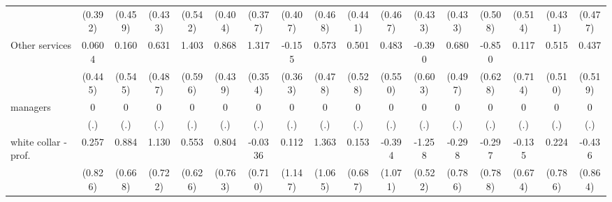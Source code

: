 {\begin{tabular}{l*{16}{c}}
                    &     (0.392)         &     (0.459)         &     (0.433)         &     (0.542)         &     (0.404)         &     (0.377)         &     (0.407)         &     (0.468)         &     (0.441)         &     (0.467)         &     (0.433)         &     (0.433)         &     (0.508)         &     (0.514)         &     (0.431)         &     (0.477)         \\
[1em]
Other services      &      0.0604         &       0.160         &       0.631         &       1.403\sym{*}  &       0.868\sym{*}  &       1.317\sym{***}&      -0.155         &       0.573         &       0.501         &       0.483         &      -0.390         &       0.680         &      -0.850         &       0.117         &       0.515         &       0.437         \\
                    &     (0.445)         &     (0.545)         &     (0.487)         &     (0.596)         &     (0.439)         &     (0.354)         &     (0.363)         &     (0.478)         &     (0.528)         &     (0.550)         &     (0.603)         &     (0.497)         &     (0.628)         &     (0.714)         &     (0.510)         &     (0.519)         \\
[1em]
managers            &           0         &           0         &           0         &           0         &           0         &           0         &           0         &           0         &           0         &           0         &           0         &           0         &           0         &           0         &           0         &           0         \\
                    &         (.)         &         (.)         &         (.)         &         (.)         &         (.)         &         (.)         &         (.)         &         (.)         &         (.)         &         (.)         &         (.)         &         (.)         &         (.)         &         (.)         &         (.)         &         (.)         \\
[1em]
white collar - prof.&       0.257         &       0.884         &       1.130         &       0.553         &       0.804         &     -0.0336         &       0.112         &       1.363         &       0.153         &      -0.394         &      -1.258\sym{*}  &      -0.298         &      -0.297         &      -0.135         &       0.224         &      -0.436         \\
                    &     (0.826)         &     (0.668)         &     (0.722)         &     (0.626)         &     (0.763)         &     (0.710)         &     (1.147)         &     (1.065)         &     (0.687)         &     (1.071)         &     (0.522)         &     (0.786)         &     (0.788)         &     (0.674)         &     (0.786)         &     (0.864)         \\

\end{tabular}}
